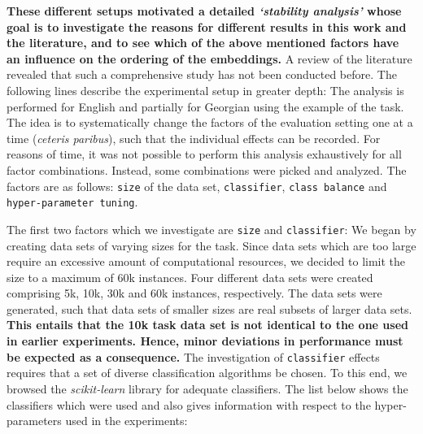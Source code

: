 \textbf{These different setups motivated a detailed \textit{`stability analysis'} whose goal is  to investigate the reasons for different results in this work and the literature, and  to see which of the above mentioned factors have an influence on the ordering of the embeddings.} A review of the literature revealed that such a comprehensive study has not been conducted before. The following lines describe the experimental setup in greater depth: The analysis is performed for English and partially for Georgian using the example of the  task. The idea is to systematically change the factors of the evaluation setting one at a time (\textit{ceteris paribus}), such that the individual effects can be recorded. For reasons of time, it was not possible to perform this analysis exhaustively for all factor combinations. Instead, some combinations were picked and analyzed. The factors are as follows: \texttt{size} of the data set, \texttt{classifier}, \texttt{class balance} and \texttt{hyper-parameter tuning}.

 The first two factors which we investigate are \texttt{size} and \texttt{classifier}: We began by creating data sets of varying sizes for the  task. Since data sets which are too large require an excessive amount of computational resources, we decided to limit the size to a maximum of 60k instances. Four different data sets were created comprising 5k, 10k, 30k and 60k instances, respectively. The data sets were generated, such that data sets of smaller sizes are real subsets of larger data sets. \textbf{This entails that the 10k  task data set is not identical to the one used in earlier experiments. Hence, minor deviations in performance must be expected as a consequence.} The investigation of \texttt{classifier} effects requires that a set of diverse classification algorithms be chosen. To this end, we browsed the \textit{scikit-learn} library for adequate classifiers. The list below shows the classifiers which were used and also gives information with respect to the hyper-parameters used in the experiments:

